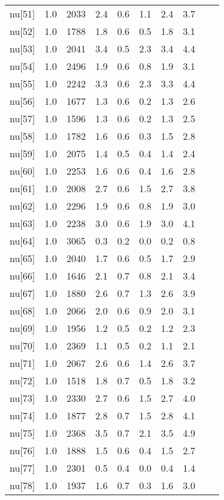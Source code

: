 \begin{longtable}{lrrrrrrr p{} | p{} |}
  nu[51] & 1.0 & 2033 & 2.4 & 0.6 & 1.1 & 2.4 & 3.7 \\ 
  nu[52] & 1.0 & 1788 & 1.8 & 0.6 & 0.5 & 1.8 & 3.1 \\ 
  nu[53] & 1.0 & 2041 & 3.4 & 0.5 & 2.3 & 3.4 & 4.4 \\ 
  nu[54] & 1.0 & 2496 & 1.9 & 0.6 & 0.8 & 1.9 & 3.1 \\ 
  nu[55] & 1.0 & 2242 & 3.3 & 0.6 & 2.3 & 3.3 & 4.4 \\ 
  nu[56] & 1.0 & 1677 & 1.3 & 0.6 & 0.2 & 1.3 & 2.6 \\ 
  nu[57] & 1.0 & 1596 & 1.3 & 0.6 & 0.2 & 1.3 & 2.5 \\ 
  nu[58] & 1.0 & 1782 & 1.6 & 0.6 & 0.3 & 1.5 & 2.8 \\ 
  nu[59] & 1.0 & 2075 & 1.4 & 0.5 & 0.4 & 1.4 & 2.4 \\ 
  nu[60] & 1.0 & 2253 & 1.6 & 0.6 & 0.4 & 1.6 & 2.8 \\ 
  nu[61] & 1.0 & 2008 & 2.7 & 0.6 & 1.5 & 2.7 & 3.8 \\ 
  nu[62] & 1.0 & 2296 & 1.9 & 0.6 & 0.8 & 1.9 & 3.0 \\ 
  nu[63] & 1.0 & 2238 & 3.0 & 0.6 & 1.9 & 3.0 & 4.1 \\ 
  nu[64] & 1.0 & 3065 & 0.3 & 0.2 & 0.0 & 0.2 & 0.8 \\ 
  nu[65] & 1.0 & 2040 & 1.7 & 0.6 & 0.5 & 1.7 & 2.9 \\ 
  nu[66] & 1.0 & 1646 & 2.1 & 0.7 & 0.8 & 2.1 & 3.4 \\ 
  nu[67] & 1.0 & 1880 & 2.6 & 0.7 & 1.3 & 2.6 & 3.9 \\ 
  nu[68] & 1.0 & 2066 & 2.0 & 0.6 & 0.9 & 2.0 & 3.1 \\ 
  nu[69] & 1.0 & 1956 & 1.2 & 0.5 & 0.2 & 1.2 & 2.3 \\ 
  nu[70] & 1.0 & 2369 & 1.1 & 0.5 & 0.2 & 1.1 & 2.1 \\ 
  nu[71] & 1.0 & 2067 & 2.6 & 0.6 & 1.4 & 2.6 & 3.7 \\ 
  nu[72] & 1.0 & 1518 & 1.8 & 0.7 & 0.5 & 1.8 & 3.2 \\ 
  nu[73] & 1.0 & 2330 & 2.7 & 0.6 & 1.5 & 2.7 & 4.0 \\ 
  nu[74] & 1.0 & 1877 & 2.8 & 0.7 & 1.5 & 2.8 & 4.1 \\ 
  nu[75] & 1.0 & 2368 & 3.5 & 0.7 & 2.1 & 3.5 & 4.9 \\ 
  nu[76] & 1.0 & 1888 & 1.5 & 0.6 & 0.4 & 1.5 & 2.7 \\ 
  nu[77] & 1.0 & 2301 & 0.5 & 0.4 & 0.0 & 0.4 & 1.4 \\ 
  nu[78] & 1.0 & 1937 & 1.6 & 0.7 & 0.3 & 1.6 & 3.0 \\ 

\end{longtable}
